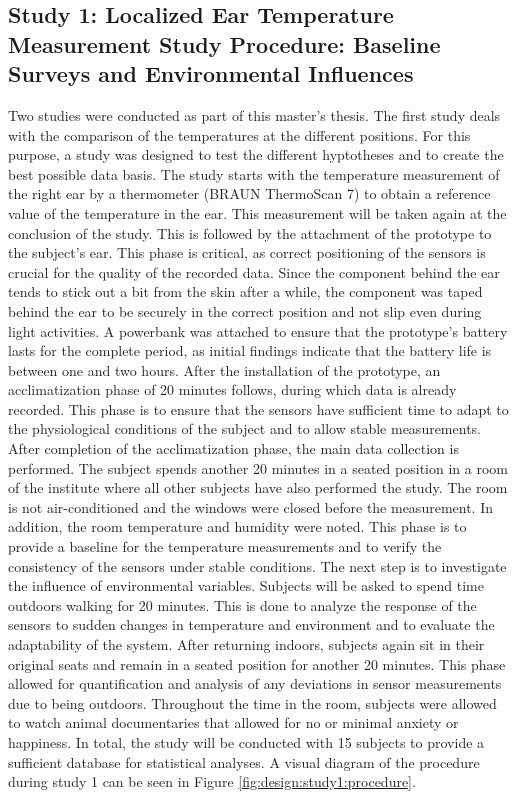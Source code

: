 \subsection{Study 1: Localized Ear Temperature Measurement Study Procedure: Baseline Surveys and Environmental Influences}
\label{ch:Design:Study:Study1}
Two studies were conducted as part of this master's thesis. 
The first study deals with the comparison of the temperatures at the different positions.
For this purpose, a study was designed to test the different hyptotheses and to create the best possible data basis. 
The study starts with the temperature measurement of the right ear by a thermometer (BRAUN ThermoScan 7) to obtain a reference value of the temperature in the ear. 
This measurement will be taken again at the conclusion of the study.
This is followed by the attachment of the prototype to the subject's ear. This phase is critical, as correct positioning of the sensors is crucial for the quality of the recorded data.
Since the component behind the ear tends to stick out a bit from the skin after a while, the component was taped behind the ear to be securely in the correct position and not slip even during light activities. 
A powerbank was attached to ensure that the prototype's battery lasts for the complete period, as initial findings indicate that the battery life is between one and two hours.
After the installation of the prototype, an acclimatization phase of 20 minutes follows, during which data is already recorded. 
This phase is to ensure that the sensors have sufficient time to adapt to the physiological conditions of the subject and to allow stable measurements.
After completion of the acclimatization phase, the main data collection is performed. 
The subject spends another 20 minutes in a seated position in a room of the institute where all other subjects have also performed the study. 
The room is not air-conditioned and the windows were closed before the measurement.
In addition, the room temperature and humidity were noted. 
This phase is to provide a baseline for the temperature measurements and to verify the consistency of the sensors under stable conditions.
The next step is to investigate the influence of environmental variables. 
Subjects will be asked to spend time outdoors walking for 20 minutes. 
This is done to analyze the response of the sensors to sudden changes in temperature and environment and to evaluate the adaptability of the system.
After returning indoors, subjects again sit in their original seats and remain in a seated position for another 20 minutes. 
This phase allowed for quantification and analysis of any deviations in sensor measurements due to being outdoors.
Throughout the time in the room, subjects were allowed to watch animal documentaries that allowed for no or minimal anxiety or happiness. 
In total, the study will be conducted with 15 subjects to provide a sufficient database for statistical analyses.
A visual diagram of the procedure during study 1 can be seen in Figure \ref{fig:design:study1:procedure}.

